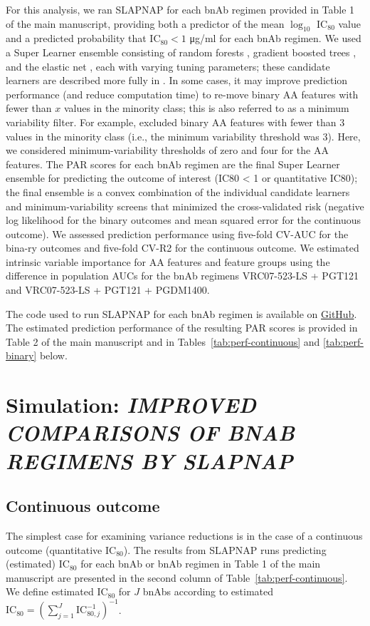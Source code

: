 \documentclass[10pt]{article}
\begin{document}
For this analysis, we ran SLAPNAP \citep{williamson2021} for each bnAb regimen provided in Table 1 of the main manuscript, providing both a predictor of the mean $\log_{10}$ IC$_{80}$ value and a predicted probability that IC$_{80} < 1$ \si{\ug}/ml for each bnAb regimen. We used a Super Learner ensemble consisting of random forests \citep{breiman2001}, gradient boosted trees \citep{friedman2001}, and the elastic net \citep{zou2005}, each with varying tuning parameters; these candidate learners are described more fully in \citet{williamson2021}. In some cases, it may improve prediction performance (and reduce computation time) to re-move binary AA features with fewer than $x$ values in the minority class; this is also referred to as a minimum variability filter. For example, \citet{magaret2019} excluded binary AA features with fewer than 3 values in the minority class (i.e., the minimum variability threshold was 3). Here, we considered minimum-variability thresholds of zero and four for the AA features. The PAR scores for each bnAb regimen are the final Super Learner ensemble for predicting the outcome of interest (IC80 < 1 or quantitative IC80); the final ensemble is a convex combination of the individual candidate learners and minimum-variability screens that minimized the cross-validated risk (negative log likelihood for the binary outcomes and mean squared error for the continuous outcome). We assessed prediction performance using five-fold CV-AUC for the bina-ry outcomes and five-fold CV-R2 for the continuous outcome. We estimated intrinsic variable importance for AA features and feature groups using the difference in population AUCs for the bnAb regimens VRC07-523-LS + PGT121 and VRC07-523-LS + PGT121 + PGDM1400. 

The code used to run SLAPNAP for each bnAb regimen is available on \href{https://www.github.com/bdwilliamson/clinical_slapnap}{GitHub}. The estimated prediction performance of the resulting PAR scores is provided in Table 2 of the main manuscript and in Tables~\ref{tab:perf-continuous} and \ref{tab:perf-binary} below. 

\section*{Simulation: \textit{IMPROVED COMPARISONS OF BNAB REGIMENS BY SLAPNAP}}\label{sec:var_reduce}
\subsection*{Continuous outcome}
The simplest case for examining variance reductions is in the case of a continuous outcome (quantitative IC$_{80}$). The results from SLAPNAP runs predicting (estimated) IC$_{80}$ for each bnAb or bnAb regimen in Table 1 of the main manuscript are presented in the second column of Table~\ref{tab:perf-continuous}. We define estimated IC$_{80}$ for $J$ bnAbs according to estimated $\text{IC}_{80} = \left(\sum_{j=1}^J \text{IC}_{80,j}^{-1}\right)^{-1}$.
\end{document}
